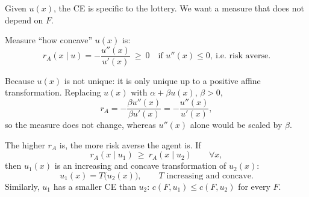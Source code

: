 \documentclass[11pt]{article}
\begin{document}
Given $u(x)$, the CE is specific to the lottery. We want a measure that does not
depend on $F$.

 Measure ``how concave'' $u(x)$ is:
\[ r_A(x\mid u)=-\frac{u''(x)}{u'(x)}\ \ge\ 0 \quad\text{if } u''(x)\le 0,
   \ \text{i.e.\ risk averse.} \]

 Because $u(x)$ is not unique: it is only unique up to a
positive affine transformation. Replacing $u(x)$ with $\alpha+\beta u(x)$,
$\beta>0$,
\[ r_A=-\frac{\beta u''(x)}{\beta u'(x)}=-\frac{u''(x)}{u'(x)}, \]
so the measure does not change, whereas $u''(x)$ alone would be scaled by $\beta$.

 The higher $r_A$ is, the more risk averse the agent is. If
\[ r_A(x\mid u_1)\ \ge\ r_A(x\mid u_2) \qquad \forall x, \]
then $u_1(x)$ is an increasing and concave transformation of $u_2(x)$:
\[ u_1(x)=T\bigl(u_2(x)\bigr), \qquad T \text{ increasing and concave}. \]
Similarly, $u_1$ has a smaller CE than $u_2$: $c(F,u_1)\le c(F,u_2)$ for every $F$.
\end{document}
